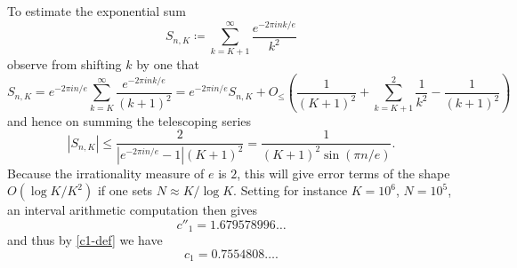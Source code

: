 \documentclass[10pt,a4paper,reqno]{amsart}
\numberwithin{equation}{section}
\theoremstyle{plain}
\theoremstyle{definition}
\begin{document}
To estimate the exponential sum
$$ S_{n,K} \coloneqq \sum_{k=K+1}^\infty \frac{e^{-2\pi i n k/e}}{k^2}$$
observe from shifting $k$ by one that
$$ S_{n,K} = e^{-2\pi i n/e} \sum_{k=K}^\infty \frac{e^{-2\pi i n k/e}}{(k+1)^2}
= e^{-2\pi i n/e} S_{n,K} + O_{\leq}\left( \frac{1}{(K+1)^2} + \sum_{k=K+1}^2 \frac{1}{k^2} -\frac{1}{(k+1)^2}\right)$$
and hence on summing the telescoping series
$$ |S_{n,K}| \leq \frac{2}{|e^{-2\pi i n/e}-1| (K+1)^2} = \frac{1}{(K+1)^2 \sin(\pi n/e)}.$$
Because the irrationality measure of $e$ is $2$, this will give error terms of the shape $O(\log K/K^2)$ if one sets $N \approx K / \log K$.  Setting for instance $K = 10^6$, $N = 10^5$, an interval arithmetic computation then gives
$$c''_1 = 1.679578996\dots$$
and thus by \eqref{c1-def} we have
$$ c_1 = 0.7554808\dots.$$
\end{document}
